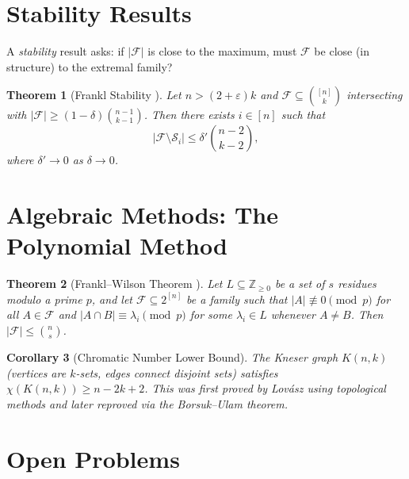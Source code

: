\documentclass[12pt,a4paper]{amsart}
\newtheorem{theorem}{Theorem}[section]
\newtheorem{corollary}[theorem]{Corollary}
\theoremstyle{definition}
\theoremstyle{remark}
\newcommand{\Z}{\mathbb{Z}}
\begin{document}
\section{Stability Results}\label{sec:stability}

A \emph{stability} result asks: if $|\mathcal{F}|$ is close to the maximum, must
$\mathcal{F}$ be close (in structure) to the extremal family?

\begin{theorem}[Frankl Stability \cite{Frankl1987stability}]\label{thm:frankl_stab}
Let $n > (2+\varepsilon)k$ and $\mathcal{F} \subseteq \binom{[n]}{k}$ intersecting with
$|\mathcal{F}| \geq (1-\delta)\binom{n-1}{k-1}$. Then there exists $i \in [n]$ such
that
\[
  |\mathcal{F} \setminus \mathcal{S}_i| \leq \delta' \binom{n-2}{k-2},
\]
where $\delta' \to 0$ as $\delta \to 0$.
\end{theorem}

\section{Algebraic Methods: The Polynomial Method}\label{sec:algebraic}

\begin{theorem}[Frankl--Wilson Theorem \cite{FranklWilson1981}]\label{thm:frankl_wilson}
Let $L \subseteq \Z_{\geq 0}$ be a set of $s$ residues modulo a prime $p$, and let
$\mathcal{F} \subseteq 2^{[n]}$ be a family such that $|A| \not\equiv 0 \pmod{p}$
for all $A \in \mathcal{F}$ and $|A \cap B| \equiv \lambda_i \pmod{p}$ for some
$\lambda_i \in L$ whenever $A \neq B$. Then $|\mathcal{F}| \leq \binom{n}{s}$.
\end{theorem}

\begin{corollary}[Chromatic Number Lower Bound]\label{cor:chromatic}
The Kneser graph $K(n, k)$ (vertices are $k$-sets, edges connect disjoint sets)
satisfies $\chi(K(n, k)) \geq n - 2k + 2$. This was first proved by Lovász
using topological methods \cite{Lovasz1978} and later reproved via the
Borsuk--Ulam theorem.
\end{corollary}

\section{Open Problems}\label{sec:open}
\end{document}
